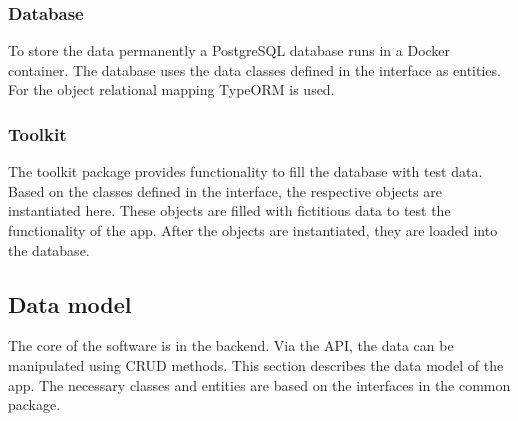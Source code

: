     \subsubsection*{Database}
    To store the data permanently a PostgreSQL database runs in a Docker container. The database uses the data classes defined in the interface as entities. For the object relational mapping TypeORM is used. 
    
    \subsubsection*{Toolkit}
    The toolkit package provides functionality to fill the database with test data. Based on the classes defined in the interface, the respective objects are instantiated here. These objects are filled with fictitious data to test the functionality of the app. After the objects are instantiated, they are loaded into the database.

    \subsection*{Data model}
    The core of the software is in the backend. Via the API, the data can be manipulated using CRUD methods. This section describes the data model of the app. The necessary classes and entities are based on the interfaces in the common package.
    
